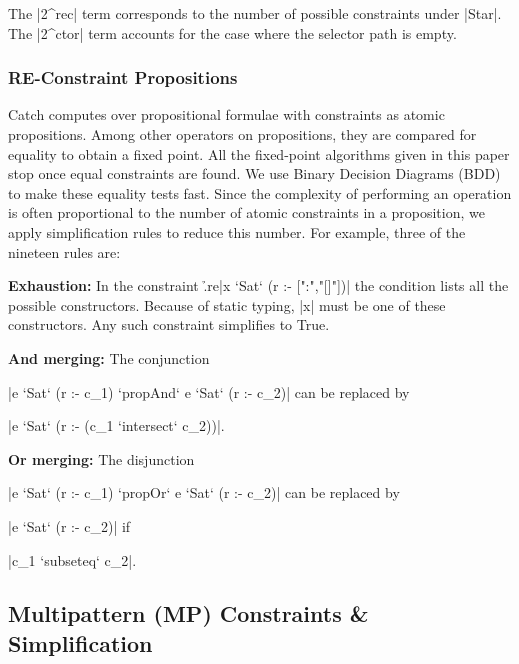 \documentclass[preprint]{sigplanconf}
\newcommand{\para}[1]{\vspace{2mm}\noindent\textbf{#1}}
\begin{document}
The |2^rec| term corresponds to the number of possible constraints under |Star|. The |2^ctor| term accounts for the case where the selector path is empty.


\subsubsection{RE-Constraint Propositions}
\label{sec:re-propositions}

Catch computes over propositional formulae with constraints as atomic propositions. Among other operators on propositions, they are compared for equality to obtain a fixed point. All the fixed-point algorithms given in this paper stop once equal constraints are found. We use Binary Decision Diagrams (BDD) \cite{lee:bdd} to make these equality tests fast. Since the complexity of performing an operation is often proportional to the number of atomic constraints in a proposition, we apply simplification rules to reduce this number. For example, three of the nineteen rules are:

\para{Exhaustion:} In the constraint \h{.re}|x `Sat` (r :- [":","[]"])| the condition lists all the possible constructors. Because of static typing, |x| must be one of these constructors. Any such constraint simplifies to True.

\para{And merging:} The conjunction \ignore|e `Sat` (r :- c_1) `propAnd` e `Sat` (r :- c_2)| can be replaced by \ignore|e `Sat` (r :- (c_1 `intersect` c_2))|.

\para{Or merging:} The disjunction \ignore|e `Sat` (r :- c_1) `propOr` e `Sat` (r :- c_2)| can be replaced by \ignore|e `Sat` (r :- c_2)| if \ignore|c_1 `subseteq` c_2|.


\subsection{Multipattern (MP) Constraints \& Simplification}
\label{sec:multipattern}
\end{document}
